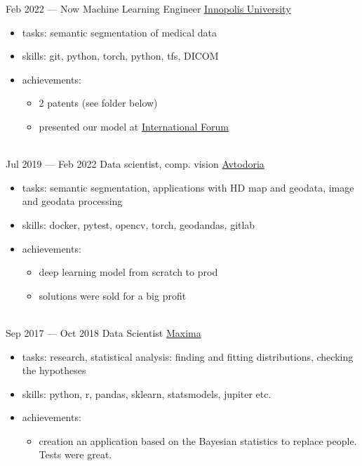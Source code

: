 \documentclass[letterpaper]{twentysecondcv} %
\begin{document}
\begin{twenty} %
        \twentyitem
        {Feb 2022 —}
        {Now}
        {Machine Learning Engineer}
        {\href{https://https://innopolis.university/en/}{Innopolis University}}
        {}
        {
        {\begin{itemize}
            \item tasks: semantic segmentation of medical data
            \item skills: git, python, torch, python, tfs, DICOM
            \item achievements:
            {\begin{itemize}
                \item 2 patents (see folder below)
                \item presented our model at {\href{https://inno-onco.ru/}{International Forum}}
            \end{itemize}
            }
        \end{itemize}}
        }
        \\

        \twentyitem
        {Jul 2019 —}
        {Feb 2022}
        {Data scientist, comp. vision}
        {  \href{https://avtodoria.ru/}{Avtodoria}}
        {}
        {
        {\begin{itemize}
            \item tasks: semantic segmentation, applications with HD map and geodata, image and geodata processing
            \item skills: docker, pytest, opencv, torch, geodandas, gitlab
            \item achievements:
            {\begin{itemize}
                \item deep learning model from scratch to prod
                \item solutions were sold for a big profit
            \end{itemize}
            }            
        \end{itemize}}
        }
        \\
        \twentyitem
        {Sep 2017 —}
        {Oct 2018}
        {Data Scientist}
        {\href{http://maxima.life/}{Maxima}}
        {}
        {
        {\begin{itemize}
            \item tasks: research, statistical analysis: finding and fitting distributions, checking the hypotheses
            \item skills: python, r, pandas, sklearn, statsmodels, jupiter etc.
            \item achievements:
            {\begin{itemize}
                \item creation an application based on the Bayesian statistics to replace people. Tests were great.
            \end{itemize}
            }            
        \end{itemize}}
        }
\end{twenty}
\end{document}

